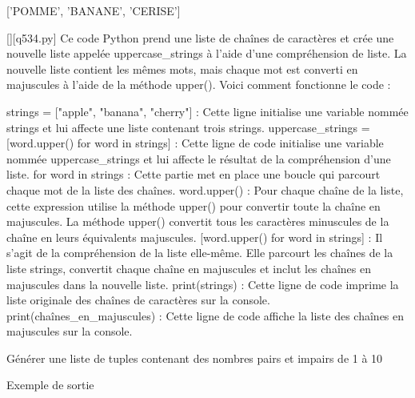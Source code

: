 ['POMME', 'BANANE', 'CERISE']
        \par
        \begin{solution}
            \renewcommand{\nomfichier}{q534.py}
            \pythonfile{\chemincode \nomfichier}[][\nomfichier]
            Ce code Python prend une liste de chaînes de caractères et crée une nouvelle liste appelée uppercase_strings à l'aide d'une compréhension de liste. La nouvelle liste contient les mêmes mots, mais chaque mot est converti en majuscules à l'aide de la méthode upper(). Voici comment fonctionne le code :

    strings = ["apple", "banana", "cherry"] : Cette ligne initialise une variable nommée strings et lui affecte une liste contenant trois strings.
    uppercase_strings = [word.upper() for word in strings] : Cette ligne de code initialise une variable nommée uppercase_strings et lui affecte le résultat de la compréhension d'une liste.
        for word in strings : Cette partie met en place une boucle qui parcourt chaque mot de la liste des chaînes.
        word.upper() : Pour chaque chaîne de la liste, cette expression utilise la méthode upper() pour convertir toute la chaîne en majuscules. La méthode upper() convertit tous les caractères minuscules de la chaîne en leurs équivalents majuscules.
        [word.upper() for word in strings] : Il s'agit de la compréhension de la liste elle-même. Elle parcourt les chaînes de la liste strings, convertit chaque chaîne en majuscules et inclut les chaînes en majuscules dans la nouvelle liste.
    print(strings) : Cette ligne de code imprime la liste originale des chaînes de caractères sur la console.
    print(chaînes_en_majuscules) : Cette ligne de code affiche la liste des chaînes en majuscules sur la console.
        \end{solution}
        

        \question
        Générer une liste de tuples contenant des nombres pairs et impairs de 1 à 10

Exemple de sortie


